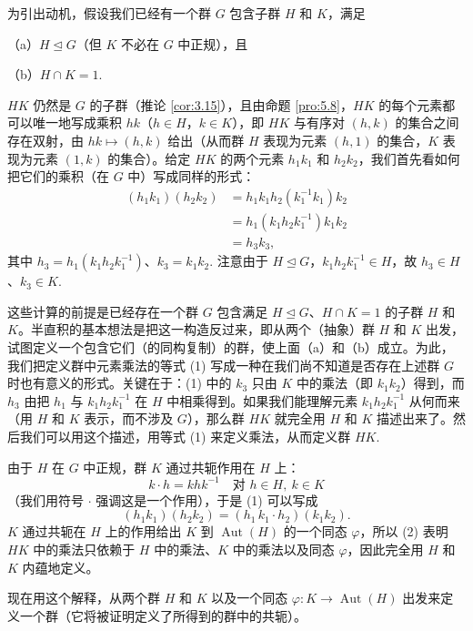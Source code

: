 为引出动机，假设我们已经有一个群 \(G\) 包含子群 \(H\) 和 \(K\)，满足

（a）\(H \trianglelefteq G\)（但 \(K\) 不必在 \(G\) 中正规），且

（b）\(H \cap K = 1\).

\(HK\) 仍然是 \(G\) 的子群（推论 \ref{cor:3.15}），且由命题 \ref{pro:5.8}，\(HK\) 的每个元素都可以唯一地写成乘积 \(hk\)（\(h \in H\)，\(k \in K\)），即 \(HK\) 与有序对 \((h, k)\) 的集合之间存在双射，由 \(hk \mapsto (h, k)\) 给出（从而群 \(H\) 表现为元素 \((h, 1)\) 的集合，\(K\) 表现为元素 \((1, k)\) 的集合）。给定 \(HK\) 的两个元素 \(h_1k_1\) 和 \(h_2k_2\)，我们首先看如何把它们的乘积（在 \(G\) 中）写成同样的形式：
\[
\begin{aligned}
(h_1k_1)(h_2k_2) &= h_1k_1h_2(k_1^{-1}k_1)k_2 \\
&= h_1(k_1h_2k_1^{-1})k_1k_2 \\
&= h_3k_3,
\end{aligned} \tag{5.1}
\]
其中 \(h_3 = h_1(k_1h_2k_1^{-1})\)、\(k_3 = k_1k_2\). 注意由于 \(H \trianglelefteq G\)，\(k_1h_2k_1^{-1} \in H\)，故 \(h_3 \in H\)、\(k_3 \in K\).

这些计算的前提是已经存在一个群 \(G\) 包含满足 \(H \trianglelefteq G\)、\(H \cap K = 1\) 的子群 \(H\) 和 \(K\)。半直积的基本想法是把这一构造反过来，即从两个（抽象）群 \(H\) 和 \(K\) 出发，试图定义一个包含它们（的同构复制）的群，使上面（a）和（b）成立。为此，我们把定义群中元素乘法的等式 (1) 写成一种在我们尚不知道是否存在上述群 \(G\) 时也有意义的形式。关键在于：(1) 中的 \(k_3\) 只由 \(K\) 中的乘法（即 \(k_1k_2\)）得到，而 \(h_3\) 由把 \(h_1\) 与 \(k_1h_2k_1^{-1}\) 在 \(H\) 中相乘得到。如果我们能理解元素 \(k_1h_2k_1^{-1}\) 从何而来（用 \(H\) 和 \(K\) 表示，而不涉及 \(G\)），那么群 \(HK\) 就完全用 \(H\) 和 \(K\) 描述出来了。然后我们可以用这个描述，用等式 (1) 来定义乘法，从而定义群 \(HK\).

由于 \(H\) 在 \(G\) 中正规，群 \(K\) 通过共轭作用在 \(H\) 上：
\[
k \cdot h = khk^{-1} \quad \text{对 } h \in H,\ k \in K
\]
（我们用符号 \(\cdot\) 强调这是一个作用），于是 (1) 可以写成
\[
(h_1k_1)(h_2k_2) = (h_1\, k_1 \cdot h_2)(k_1k_2). \tag{5.2}
\]
\(K\) 通过共轭在 \(H\) 上的作用给出 \(K\) 到 \(\operatorname{Aut}(H)\) 的一个同态 \(\varphi\)，所以 (2) 表明 \(HK\) 中的乘法只依赖于 \(H\) 中的乘法、\(K\) 中的乘法以及同态 \(\varphi\)，因此完全用 \(H\) 和 \(K\) 内蕴地定义。

现在用这个解释，从两个群 \(H\) 和 \(K\) 以及一个同态 \(\varphi : K \to \operatorname{Aut}(H)\) 出发来定义一个群（它将被证明定义了所得到的群中的共轭）。

